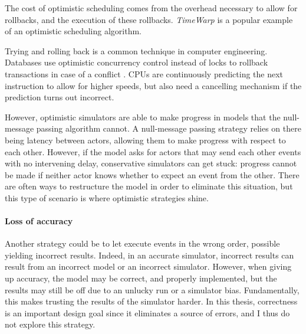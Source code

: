 The cost of optimistic scheduling comes from the overhead necessary to allow for rollbacks, and the execution of these rollbacks.
\emph{TimeWarp} \cite{jefferson_virtual_1985} is a popular example of an optimistic scheduling algorithm.

Trying and rolling back is a common technique in computer engineering.
Databases use optimistic concurrency control instead of locks to rollback transactions in case of a conflict \cite{dragojevic_no_2015}.
CPUs are continuously predicting the next instruction to allow for higher speeds, but also need a cancelling mechanism if the prediction turns out incorrect.


However, optimistic simulators are able to make progress in models that the null-message passing algorithm cannot.
A null-message passing strategy relies on there being latency between actors, allowing them to make progress with respect to each other.
However, if the model asks for actors that may send each other events with no intervening delay, conservative simulators can get stuck: progress cannot be made if neither actor knows whether to expect an event from the other.
There are often ways to restructure the model in order to eliminate this situation, but this type of scenario is where optimistic strategies shine.

\paragraph{Loss of accuracy}
Another strategy could be to let execute events in the wrong order, possible yielding incorrect results.  
Indeed, in an accurate simulator, incorrect results can result from an incorrect model or an incorrect simulator.
However, when giving up accuracy, the model may be correct, and properly implemented, but the results may still be off due to an unlucky run or a simulator bias.
Fundamentally, this makes trusting the results of the simulator harder.
In this thesis, correctness is an important design goal since it eliminates a source of errors, and I thus do not explore this strategy.
